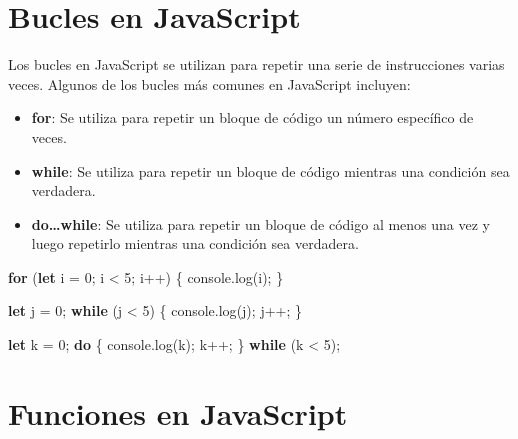 \documentclass[
  a4paper,
  DIV=11,
  numbers=noendperiod,
  onepage,
  openany]{scrreprt}
\newenvironment{Shaded}{\begin{snugshade}}{\end{snugshade}}
\newcommand{\BuiltInTok}[1]{\textcolor[rgb]{0.00,0.23,0.31}{#1}}
\newcommand{\ControlFlowTok}[1]{\textcolor[rgb]{0.00,0.23,0.31}{\textbf{#1}}}
\newcommand{\DecValTok}[1]{\textcolor[rgb]{0.68,0.00,0.00}{#1}}
\newcommand{\FunctionTok}[1]{\textcolor[rgb]{0.28,0.35,0.67}{#1}}
\newcommand{\KeywordTok}[1]{\textcolor[rgb]{0.00,0.23,0.31}{\textbf{#1}}}
\newcommand{\NormalTok}[1]{\textcolor[rgb]{0.00,0.23,0.31}{#1}}
\newcommand{\OperatorTok}[1]{\textcolor[rgb]{0.37,0.37,0.37}{#1}}
\providecommand{\tightlist}{%
  \setlength{\itemsep}{0pt}\setlength{\parskip}{0pt}}\usepackage{longtable,booktabs,array}
\begin{document}
\begin{tcolorbox}
\section{Bucles en JavaScript}\label{bucles-en-javascript}

Los bucles en JavaScript se utilizan para repetir una serie de
instrucciones varias veces. Algunos de los bucles más comunes en
JavaScript incluyen:

\begin{itemize}
\tightlist
\item
  \textbf{for}: Se utiliza para repetir un bloque de código un número
  específico de veces.
\item
  \textbf{while}: Se utiliza para repetir un bloque de código mientras
  una condición sea verdadera.
\item
  \textbf{do\ldots while}: Se utiliza para repetir un bloque de código
  al menos una vez y luego repetirlo mientras una condición sea
  verdadera.
\end{itemize}

\begin{Shaded}
\begin{Highlighting}[]
\ControlFlowTok{for}\NormalTok{ (}\KeywordTok{let}\NormalTok{ i }\OperatorTok{=} \DecValTok{0}\OperatorTok{;}\NormalTok{ i }\OperatorTok{\textless{}} \DecValTok{5}\OperatorTok{;}\NormalTok{ i}\OperatorTok{++}\NormalTok{) \{}
    \BuiltInTok{console}\OperatorTok{.}\FunctionTok{log}\NormalTok{(i)}\OperatorTok{;}
\NormalTok{\}}

\KeywordTok{let}\NormalTok{ j }\OperatorTok{=} \DecValTok{0}\OperatorTok{;}
\ControlFlowTok{while}\NormalTok{ (j }\OperatorTok{\textless{}} \DecValTok{5}\NormalTok{) \{}
    \BuiltInTok{console}\OperatorTok{.}\FunctionTok{log}\NormalTok{(j)}\OperatorTok{;}
\NormalTok{    j}\OperatorTok{++;}
\NormalTok{\}}

\KeywordTok{let}\NormalTok{ k }\OperatorTok{=} \DecValTok{0}\OperatorTok{;}
\ControlFlowTok{do}\NormalTok{ \{}
    \BuiltInTok{console}\OperatorTok{.}\FunctionTok{log}\NormalTok{(k)}\OperatorTok{;}
\NormalTok{    k}\OperatorTok{++;}
\NormalTok{\} }\ControlFlowTok{while}\NormalTok{ (k }\OperatorTok{\textless{}} \DecValTok{5}\NormalTok{)}\OperatorTok{;}
\end{Highlighting}
\end{Shaded}

\section{Funciones en JavaScript}\label{funciones-en-javascript}


\end{tcolorbox}
\end{document}
